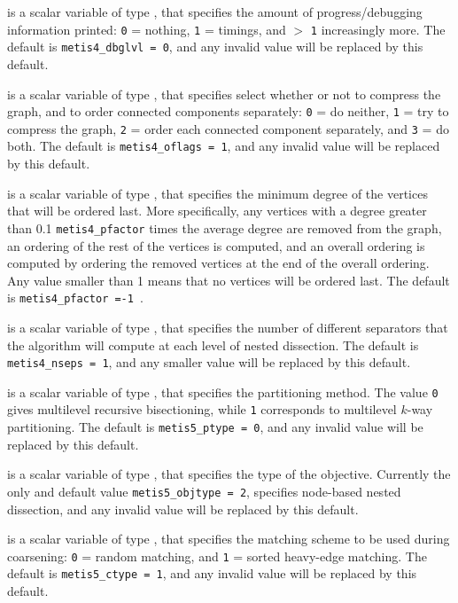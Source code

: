 \documentclass{galahad}
\begin{document}
\begin{description}
 is a scalar variable of type \integer, that specifies
the amount of progress/debugging information printed: 
{\tt 0} = nothing, {\tt 1} = timings, and $>$ {\tt 1} increasingly more.
The default is {\tt metis4\_dbglvl = 0}, and any invalid value will be
replaced by this default.

 is a scalar variable of type \integer, that specifies
select whether or not to compress the graph, and to order connected 
 components separately: {\tt 0} = do neither, 
 {\tt 1} = try to compress the graph, 
 {\tt 2} = order each connected component separately, and {\tt 3} = do both.
The default is {\tt metis4\_oflags = 1}, and any invalid value will be
replaced by this default.

 is a scalar variable of type \integer, that specifies
the minimum degree of the vertices that will be ordered last. 
More specifically, any vertices with a degree greater than 
0.1 {\tt metis4\_pfactor} times the average degree are removed from
the graph, an ordering of the rest of the vertices is computed, and an
overall ordering is computed by ordering the removed vertices at the end
of the overall ordering. Any value
smaller than 1 means that no vertices will be ordered last.
The default is {\tt metis4\_pfactor =-1 }.

 is a scalar variable of type \integer, that specifies
the number of different separators that the algorithm will compute
at each level of nested dissection.
The default is {\tt metis4\_nseps = 1}, and any smaller value
will be replaced by this default.

 is a scalar variable of type \integer, that specifies
the partitioning method. The value {\tt 0} gives multilevel recursive 
bisectioning, while {\tt 1} corresponds to multilevel $k$-way partitioning.
The default is {\tt metis5\-\_ptype = 0}, and any invalid value will be
replaced by this default.

 is a scalar variable of type \integer, that specifies
the type of the objective. Currently the only and default value
{\tt metis5\_objtype = 2}, specifies node-based nested dissection, 
and any invalid value will be replaced by this default.

 is a scalar variable of type \integer, that specifies
the matching scheme to be used during coarsening: {\tt 0} = random matching, 
 and {\tt 1} = sorted heavy-edge matching.
The default is {\tt metis5\_ctype = 1}, and any invalid value will be
replaced by this default.


\end{description}
\end{document}
